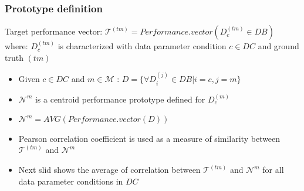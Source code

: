 \documentclass{beamer}
\begin{document}
\begin{frame}\frametitle{Prototype definition}
\small{Target performance vector:} $\mathcal{T}^{(tm)} = Performance.vector(D_c^{(tm)} \in DB)$ where: $D_c^{(tm)}$ is characterized with data parameter condition $c \in DC$ and ground truth $(tm)$  \pause
\begin{itemize}
\item Given $c \in DC$ and $m \in \mathcal{M}$ : $D = \{\forall D_i^{(j)} \in DB | i = c , j = m\}$
\item $\mathcal{N}^m$ is a centroid performance prototype defined for $D_c^{(m)}$\pause
\item $\mathcal{N}^m = AVG(Performance.vector(D))$ \pause%
\item Pearson correlation coefficient is used as a measure of similarity between $\mathcal{T}^{(tm)}$ and $\mathcal{N}^m$ \pause
\item Next slid shows the average of correlation between $\mathcal{T}^{(tm)}$ and $\mathcal{N}^m$ for all data parameter conditions in $DC$
\end{itemize}
\end{frame}
\end{document}
